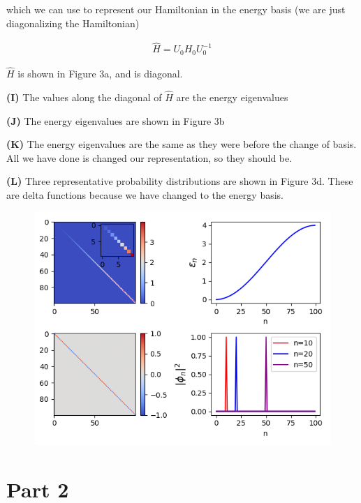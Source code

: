 \documentclass[12pt]{article}
\theoremstyle{definition}
\begin{document}
{which we can use to represent our Hamiltonian in the energy basis (we are just diagonalizing the Hamiltonian)

\begin{align*}
\hat{H} = U_{0} H_{0} U_{0}^{-1}
\end{align*}

$\hat{H}$ is shown in Figure 3a, and is diagonal.

\vspace{0.1in}
\noindent \textbf{(I)} The values along the diagonal of $\hat{H}$ are the energy eigenvalues

\vspace{0.1in}
\noindent \textbf{(J)} The energy eigenvalues are shown in Figure 3b

\vspace{0.1in}
\noindent \textbf{(K)} The energy eigenvalues are the same as they were before the change of basis. All we have done is changed our representation, so they should be. 

\vspace{0.1in}
\noindent \textbf{(L)} Three representative probability distributions are shown in Figure 3d. These are delta functions because we have changed to the energy basis.

\begin{figure}[t!]
\centering
\includegraphics[width=15cm]{p1_3}
\caption{}
\label{fig:method}
\end{figure}

\section{Part 2}

}
\end{document}
